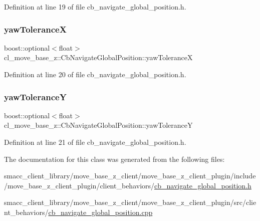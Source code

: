 Definition at line 19 of file cb\+\_\+navigate\+\_\+global\+\_\+position.\+h.

\mbox{\label{classcl__move__base__z_1_1CbNavigateGlobalPosition_a3e649f9ae9f1118c4f08332e4d5908dc}} 
\subsubsection{\texorpdfstring{yaw\+ToleranceX}{yawToleranceX}}
{\footnotesize\ttfamily boost\+::optional$<$float$>$ cl\+\_\+move\+\_\+base\+\_\+z\+::\+Cb\+Navigate\+Global\+Position\+::yaw\+ToleranceX}



Definition at line 20 of file cb\+\_\+navigate\+\_\+global\+\_\+position.\+h.

\mbox{\label{classcl__move__base__z_1_1CbNavigateGlobalPosition_a2405f30f99b72c7daae79175f3e78677}} 
\subsubsection{\texorpdfstring{yaw\+ToleranceY}{yawToleranceY}}
{\footnotesize\ttfamily boost\+::optional$<$float$>$ cl\+\_\+move\+\_\+base\+\_\+z\+::\+Cb\+Navigate\+Global\+Position\+::yaw\+ToleranceY}



Definition at line 21 of file cb\+\_\+navigate\+\_\+global\+\_\+position.\+h.



The documentation for this class was generated from the following files\+:\begin{DoxyCompactItemize}
\item 
smacc\+\_\+client\+\_\+library/move\+\_\+base\+\_\+z\+\_\+client/move\+\_\+base\+\_\+z\+\_\+client\+\_\+plugin/include/move\+\_\+base\+\_\+z\+\_\+client\+\_\+plugin/client\+\_\+behaviors/\hyperlink{cb__navigate__global__position_8h}{cb\+\_\+navigate\+\_\+global\+\_\+position.\+h}\item 
smacc\+\_\+client\+\_\+library/move\+\_\+base\+\_\+z\+\_\+client/move\+\_\+base\+\_\+z\+\_\+client\+\_\+plugin/src/client\+\_\+behaviors/\hyperlink{cb__navigate__global__position_8cpp}{cb\+\_\+navigate\+\_\+global\+\_\+position.\+cpp}\end{DoxyCompactItemize}
